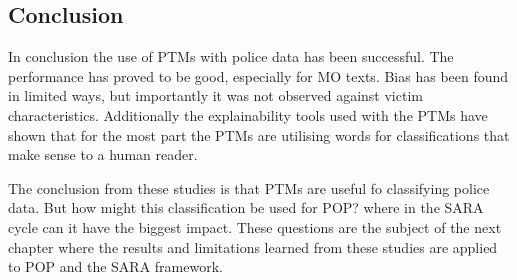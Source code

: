 \subsection{Conclusion} In conclusion the use of PTMs with police data has been successful. The performance has proved to be good, especially for MO texts. Bias has been found in limited ways, but importantly it was not observed against victim characteristics. Additionally the explainability tools used with the PTMs have shown that for the most part the PTMs are utilising words for classifications that make sense to a human reader.

The conclusion from these studies is that PTMs are useful fo classifying police data. But how might this classification be used for POP? where in the SARA cycle can it have the biggest impact. These questions are the subject of the next chapter where the results and limitations learned from these studies are applied to POP and the SARA framework.


